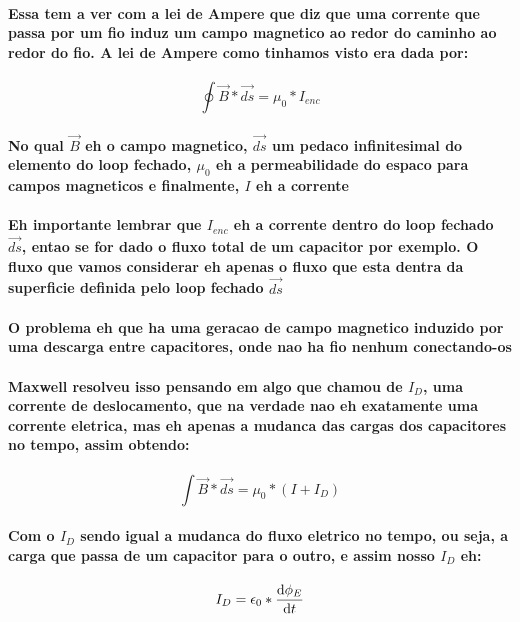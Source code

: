 \documentclass[12pt,twoside, a4paper, twocolumn]{article}
\begin{document}
\paragraph*{Essa tem a ver com a lei de Ampere que diz que uma corrente que passa por um fio induz um campo magnetico ao redor do caminho ao redor do fio. A lei de Ampere como tinhamos visto era dada por:}
\begin{equation}
    \oint \vec{B} * \vec{ds} = \mu_0 * I_{enc}
\end{equation}
\paragraph*{No qual $\vec{B}$ eh o campo magnetico, $\vec{ds}$ um pedaco infinitesimal do elemento do loop fechado, $\mu_0$ eh a permeabilidade do espaco para campos magneticos e finalmente, $I$ eh a corrente}
\paragraph*{Eh importante lembrar que $I_{enc}$ eh a corrente dentro do loop fechado $\vec{ds}$, entao se for dado o fluxo total de um capacitor por exemplo. O fluxo que vamos considerar eh apenas o fluxo que esta dentra da superficie definida pelo loop fechado $\vec{ds}$}
\paragraph*{O problema eh que ha uma geracao de campo magnetico induzido por uma descarga entre capacitores, onde nao ha fio nenhum conectando-os}
\paragraph*{Maxwell resolveu isso pensando em algo que chamou de $I_D$, uma corrente de deslocamento, que na verdade nao eh exatamente uma corrente eletrica, mas eh apenas a mudanca das cargas dos capacitores no tempo, assim obtendo:}
\begin{equation}
    \int \vec{B} * \vec{ds} = \mu_0 * \left(I +I_D\right)
\end{equation}
\paragraph*{Com o $I_D$ sendo igual a mudanca do fluxo eletrico no tempo, ou seja, a carga que passa de um capacitor para o outro, e assim nosso $I_D$ eh:}
\begin{equation}
    I_D = \epsilon_0 * \frac{\mathrm d \phi_E}{\mathrm d t}
\end{equation}
\end{document}
